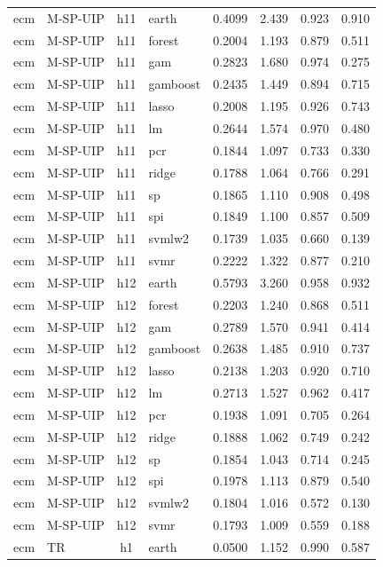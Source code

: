 \begin{ThreePartTable}
\begin{longtable}[t]{llclcccc}
ecm & M-SP-UIP & h11 & earth & 0.4099 & 2.439 & 0.923 & 0.910\\
ecm & M-SP-UIP & h11 & forest & 0.2004 & 1.193 & 0.879 & 0.511\\
ecm & M-SP-UIP & h11 & gam & 0.2823 & 1.680 & 0.974 & 0.275\\
ecm & M-SP-UIP & h11 & gamboost & 0.2435 & 1.449 & 0.894 & 0.715\\
ecm & M-SP-UIP & h11 & lasso & 0.2008 & 1.195 & 0.926 & 0.743\\
ecm & M-SP-UIP & h11 & lm & 0.2644 & 1.574 & 0.970 & 0.480\\
ecm & M-SP-UIP & h11 & pcr & 0.1844 & 1.097 & 0.733 & 0.330\\
ecm & M-SP-UIP & h11 & ridge & 0.1788 & 1.064 & 0.766 & 0.291\\
ecm & M-SP-UIP & h11 & sp & 0.1865 & 1.110 & 0.908 & 0.498\\
ecm & M-SP-UIP & h11 & spi & 0.1849 & 1.100 & 0.857 & 0.509\\
ecm & M-SP-UIP & h11 & svmlw2 & 0.1739 & 1.035 & 0.660 & 0.139\\
ecm & M-SP-UIP & h11 & svmr & 0.2222 & 1.322 & 0.877 & 0.210\\
\addlinespace
ecm & M-SP-UIP & h12 & earth & 0.5793 & 3.260 & 0.958 & 0.932\\
ecm & M-SP-UIP & h12 & forest & 0.2203 & 1.240 & 0.868 & 0.511\\
ecm & M-SP-UIP & h12 & gam & 0.2789 & 1.570 & 0.941 & 0.414\\
ecm & M-SP-UIP & h12 & gamboost & 0.2638 & 1.485 & 0.910 & 0.737\\
ecm & M-SP-UIP & h12 & lasso & 0.2138 & 1.203 & 0.920 & 0.710\\
ecm & M-SP-UIP & h12 & lm & 0.2713 & 1.527 & 0.962 & 0.417\\
ecm & M-SP-UIP & h12 & pcr & 0.1938 & 1.091 & 0.705 & 0.264\\
ecm & M-SP-UIP & h12 & ridge & 0.1888 & 1.062 & 0.749 & 0.242\\
ecm & M-SP-UIP & h12 & sp & 0.1854 & 1.043 & 0.714 & 0.245\\
ecm & M-SP-UIP & h12 & spi & 0.1978 & 1.113 & 0.879 & 0.540\\
ecm & M-SP-UIP & h12 & svmlw2 & 0.1804 & 1.016 & 0.572 & 0.130\\
ecm & M-SP-UIP & h12 & svmr & 0.1793 & 1.009 & 0.559 & 0.188\\
\addlinespace
ecm & TR & h1 & earth & 0.0500 & 1.152 & 0.990 & 0.587\\

\end{longtable}
\end{ThreePartTable}
